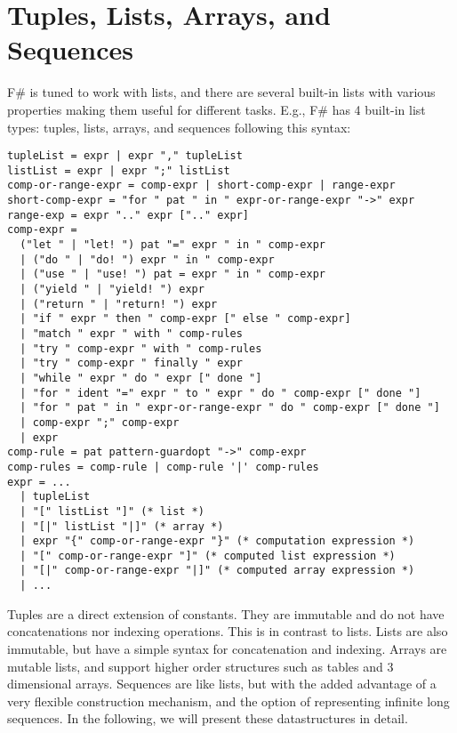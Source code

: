 \chapter{Tuples, Lists, Arrays, and Sequences}
\label{chap:lists}
F\# is tuned to work with lists, and there are several built-in lists with various properties making them useful for different tasks. E.g.,
%
%
F\# has 4 built-in list types: tuples, lists, arrays, and sequences following this syntax:
%
\begin{lstlisting}[language=ebnf]
tupleList = expr | expr "," tupleList
listList = expr | expr ";" listList
comp-or-range-expr = comp-expr | short-comp-expr | range-expr
short-comp-expr = "for " pat " in " expr-or-range-expr "->" expr
range-exp = expr ".." expr [".." expr]
comp-expr =
  ("let " | "let! ") pat "=" expr " in " comp-expr
  | ("do " | "do! ") expr " in " comp-expr
  | ("use " | "use! ") pat = expr " in " comp-expr
  | ("yield " | "yield! ") expr
  | ("return " | "return! ") expr
  | "if " expr " then " comp-expr [" else " comp-expr]
  | "match " expr " with " comp-rules
  | "try " comp-expr " with " comp-rules
  | "try " comp-expr " finally " expr
  | "while " expr " do " expr [" done "]
  | "for " ident "=" expr " to " expr " do " comp-expr [" done "]
  | "for " pat " in " expr-or-range-expr " do " comp-expr [" done "]
  | comp-expr ";" comp-expr
  | expr
comp-rule = pat pattern-guardopt "->" comp-expr
comp-rules = comp-rule | comp-rule '|' comp-rules
expr = ... 
  | tupleList
  | "[" listList "]" (* list *)
  | "[|" listList "|]" (* array *)
  | expr "{" comp-or-range-expr "}" (* computation expression *)
  | "[" comp-or-range-expr "]" (* computed list expression *)
  | "[|" comp-or-range-expr "|]" (* computed array expression *)
  | ...
\end{lstlisting}
%
Tuples are a direct extension of constants. They are immutable and do not have concatenations nor indexing operations. This is in contrast to lists. Lists are also immutable, but have a simple syntax for concatenation and indexing. Arrays are mutable lists, and support higher order structures such as tables and 3 dimensional arrays. Sequences are like lists, but with the added advantage of a very flexible construction mechanism, and the option of representing infinite long sequences. In the following, we will present these datastructures in detail.

